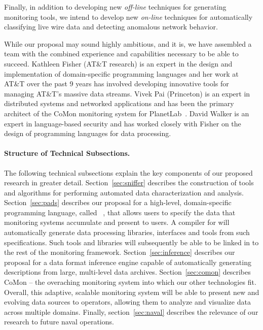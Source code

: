 Finally, in addition to developing new {\em off-line} techniques for
generating monitoring tools, we intend to develop new {\em on-line}
techniques for automatically classifying live wire data and
detecting anomalous network behavior.

While our proposal may sound highly ambitious, and it is, we have
assembled a team with the combined experience and capabilities
necessary to be able to succeed.  Kathleen Fisher (AT\&T research) 
is an expert in the design and implementation of domain-specific
programming languages and her work at AT\&T over the past 9 years
has involved developing innovative tools for managing AT\&T's
massive data streams.  Vivek Pai (Princeton) is an expert in distributed
systems and networked applications
and has been the primary architect of the CoMon monitoring system
for PlanetLab~\cite{planetlab}.  David Walker is an expert in language-based security
and has worked closely with Fisher on the design of programming languages
for data processing. 

\paragraph*{Structure of Technical Subsections.}
The following technical subsections explain the key components of
our proposed research in greater detail.  Section~\ref{sec:sniffer}
describes the construction of tools and algorithms for 
performing automated data characterization and analysis.  
Section~\ref{sec:pads} describes our proposal for a high-level, 
domain-specific programming language, called
\pads{}~\cite{fisher+:pads,fisher+:popl06,mandelbaum+:pads-ml}, that
allows users to specify the data that monitoring systems 
accumulate and present to users.  A compiler for \pads{} will
automatically generate data processing libraries, interfaces and tools
from such specifications.  Such tools and libraries will subsequently 
be able to be linked in to the
rest of the monitoring framework.   
Section~\ref{sec:inference} describes our proposal for a 
data format inference engine capable
of automatically generating \pads{} descriptions from
large, multi-level data archives.   Section~\ref{sec:comon}
describes CoMon -- the overaching monitoring system into which our other 
technologies fit.  Overall, this adaptive, scalable monitoring system will 
be able to present new and evolving data sources to operators, allowing them to
analyze and visualize data across multiple domains.  Finally, 
section~\ref{sec:naval} describes the relevance of our research to future
naval operations.


